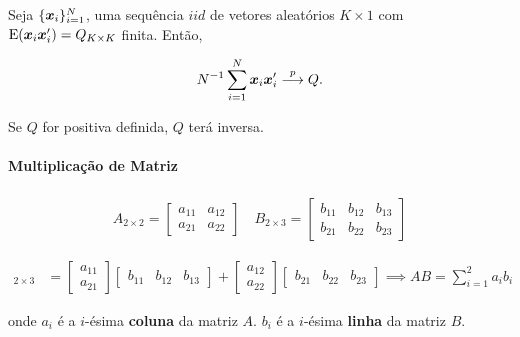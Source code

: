 \documentclass[11pt, oneside, a4paper, article]{article}
\numberwithin{equation}{section}
\begin{document}
\begin{description}
\begin{description}
\begin{defn} \label{def:lgn:mat}
Seja $\{\boldsymbol{x}_{i}\}_{i=1}^{N}$, uma sequência $iid$ de vetores aleatórios $K \times 1$ com $\text{E}(\boldsymbol{x}_{i} \boldsymbol{x}_{i}') = Q_{K \times K}$ finita.
Então, 

\vspace{-1 em}
\begin{align*}
N^{-1} \sum_{i=1}^{N}
\boldsymbol{x}_{i} \boldsymbol{x}_{i}'
 \overset{p}{\longrightarrow}  Q.
\end{align*}

Se $Q$ for positiva definida, $Q$ terá inversa.
\end{defn}

\paragraph{Multiplicação de Matriz}

\begin{align*}
A_{2 \times 2} =
\begin{bmatrix}
	a_{11} & a_{12} \\
	a_{21} & a_{22}		
\end{bmatrix}
\quad
B_{2 \times 3} =
\begin{bmatrix}
	b_{11} & b_{12} & b_{13} \\
	b_{21} & b_{22} & b_{23}		
\end{bmatrix}
\end{align*}

\begin{align*}
[AB]_{2 \times 3} &=
\begin{bmatrix}
	a_{11} \\ a_{21}
\end{bmatrix}
\begin{bmatrix}
	b_{11} & b_{12} & b_{13}
\end{bmatrix}
+
\begin{bmatrix}
	a_{12} \\ a_{22}
\end{bmatrix}
\begin{bmatrix}
	b_{21} & b_{22} & b_{23}
\end{bmatrix}
\implies
AB = \sum_{i=1}^{2} a_{i}b_{i}
\end{align*}

\noindent
onde
$a_{i}$ é a $i$-ésima \textbf{coluna} da matriz $A$.
$b_{i}$ é a $i$-ésima \textbf{linha} da matriz $B$.


\end{description}
\end{description}
\end{document}
